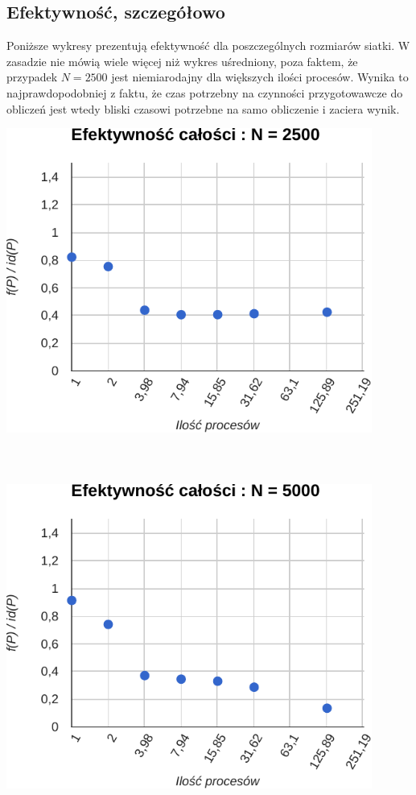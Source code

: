 \documentclass[paper=a4, fontsize=11pt]{scrartcl}	%
\numberwithin{equation}{section}		%
\numberwithin{figure}{section}			%
\numberwithin{table}{section}				%
\begin{document}
\subsection{Efektywność, szczegółowo}

Poniższe wykresy prezentują efektywność dla poszczególnych rozmiarów siatki. W
zasadzie nie mówią wiele więcej niż wykres uśredniony, poza faktem, że przypadek
${N=2500}$ jest niemiarodajny dla większych ilości procesów. Wynika to
najprawdopodobniej z faktu, że czas potrzebny na czynności przygotowawcze do
obliczeń jest wtedy bliski czasowi potrzebne na samo obliczenie i zaciera wynik.

\includegraphics[width=120mm]{report/eff-2500.pdf} \\ \ \\ \ \\ \ \\

\includegraphics[width=120mm]{report/eff-5000.pdf} \\ \ \\ \ \\ \ \\
\end{document}
